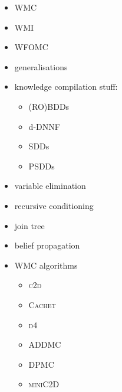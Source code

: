 \documentclass{article}
\begin{document}
\begin{itemize}
\item WMC \cite{DBLP:journals/ai/ChaviraD08}
\item WMI \cite{DBLP:conf/ijcai/BellePB15}
\item WFOMC \cite{DBLP:conf/ijcai/BroeckTMDR11,DBLP:journals/cacm/GogateD16}
\item generalisations
  \cite{DBLP:journals/ijar/BelleR20,DBLP:journals/jair/BacchusDP09,DBLP:journals/japll/KimmigBR17}
\item knowledge compilation stuff:
  \begin{itemize}
  \item (RO)BDDs \cite{DBLP:journals/tc/Bryant86}
  \item d-DNNF \cite{DBLP:journals/jancl/Darwiche01}
  \item SDDs \cite{DBLP:conf/ijcai/Darwiche11}
  \item PSDDs \cite{DBLP:conf/kr/KisaBCD14}
  \end{itemize}
\item variable elimination \cite{DBLP:journals/ai/Dechter99}
\item recursive conditioning \cite{DBLP:journals/ai/Darwiche01}
\item join tree \cite{lauritzen1988local}
\item belief propagation \cite{DBLP:conf/aaai/Pearl82}
\item WMC algorithms
  \begin{itemize}
  \item \textsc{c2d} \cite{DBLP:conf/ecai/Darwiche04}
  \item \textsc{Cachet} \cite{DBLP:conf/sat/SangBBKP04,DBLP:conf/sat/SangBK05,DBLP:conf/aaai/SangBK05}
  \item \textsc{d4} \cite{DBLP:conf/ijcai/LagniezM17}
  \item \textsc{ADDMC} \cite{DBLP:conf/aaai/DudekPV20}
  \item \textsc{DPMC} \cite{DBLP:conf/cp/DudekPV20}
  \item \textsc{miniC2D} \cite{DBLP:conf/ijcai/OztokD15}
  \end{itemize}
\end{itemize}
\end{document}
